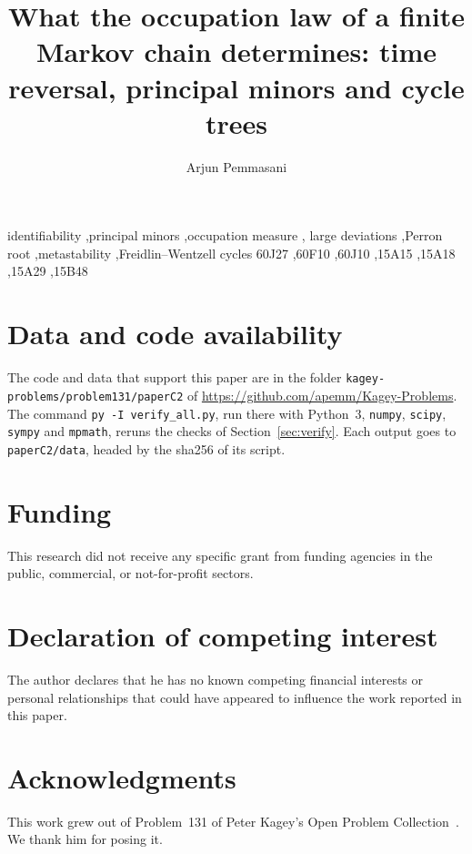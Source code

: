 \documentclass[preprint,12pt]{elsarticle}
\theoremstyle{definition}
\theoremstyle{remark}
\begin{document}
\begin{frontmatter}

\title{What the occupation law of a finite Markov chain determines: time reversal, principal minors and cycle trees}

\author{Arjun Pemmasani}

\begin{abstract}

\end{abstract}

\begin{keyword}
identifiability \sep principal minors \sep occupation measure \sep
large deviations \sep Perron root \sep metastability \sep Freidlin--Wentzell cycles
\MSC[2020] 60J27 \sep 60F10 \sep 60J10 \sep 15A15 \sep 15A18 \sep 15A29 \sep 15B48
\end{keyword}

\end{frontmatter}









\section*{Data and code availability}

The code and data that support this paper are in the folder
\nolinkurl{kagey-problems/problem131/paperC2} of
\url{https://github.com/apemm/Kagey-Problems}. The command
\texttt{py -I verify\_all.py}, run there with Python~3, \texttt{numpy}, \texttt{scipy},
\texttt{sympy} and \texttt{mpmath}, reruns the checks of Section~\ref{sec:verify}. Each
output goes to \nolinkurl{paperC2/data}, headed by the sha256 of its script.

\section*{Funding}

This research did not receive any specific grant from funding agencies in the
public, commercial, or not-for-profit sectors.

\section*{Declaration of competing interest}

The author declares that he has no known competing financial interests or
personal relationships that could have appeared to influence the work reported
in this paper.

\section*{Acknowledgments}

This work grew out of Problem~131 of Peter Kagey's Open Problem
Collection~\cite{kagey131}. We thank him for posing it.


\end{document}
